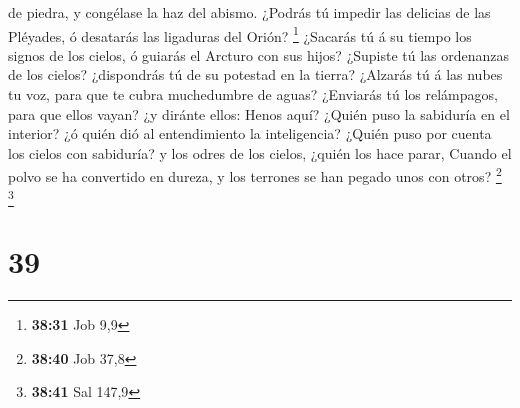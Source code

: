 de piedra, y congélase la haz del abismo.  ¿Podrás tú
impedir las delicias de las Pléyades, ó desatarás las ligaduras del
Orión? \footnote{\textbf{38:31} Job 9,9}  ¿Sacarás tú á su
tiempo los signos de los cielos, ó guiarás el Arcturo con sus hijos?
 ¿Supiste tú las ordenanzas de los cielos? ¿dispondrás tú
de su potestad en la tierra?  ¿Alzarás tú á las nubes tu
voz, para que te cubra muchedumbre de aguas?  ¿Enviarás tú
los relámpagos, para que ellos vayan? ¿y diránte ellos: Henos aquí?
 ¿Quién puso la sabiduría en el interior? ¿ó quién dió al
entendimiento la inteligencia?  ¿Quién puso por cuenta los
cielos con sabiduría? y los odres de los cielos, ¿quién los hace parar,
 Cuando el polvo se ha convertido en dureza, y los terrones
se han pegado unos con otros?   \footnote{\textbf{38:40}
  Job 37,8}  \footnote{\textbf{38:41} Sal 147,9}

\hypertarget{section-38}{%
\section{39}\label{section-38}}

